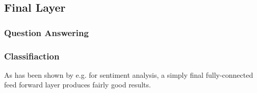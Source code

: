 \subsection{Final Layer}

\subsubsection{Question Answering}

\subsubsection{Classifiaction}

As has been shown by e.g. \cite{myagmar2019transferable} for sentiment analysis, a simply final fully-connected feed forward layer produces fairly good results.


